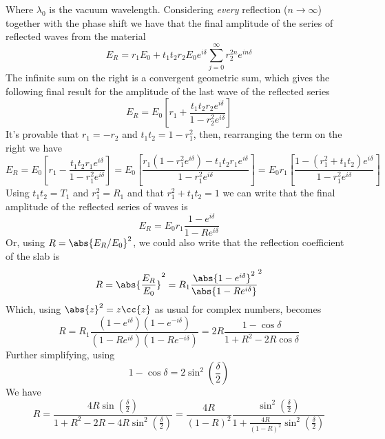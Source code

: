 \documentclass[../electromagnetism.tex]{subfiles}
\begin{document}
Where $\lambda_0$ is the vacuum wavelength. Considering \textit{every} reflection ($n\to\infty$) together with the phase shift we have that the final amplitude of the series of reflected waves from the material
\begin{equation}
	E_R=r_1E_0+t_1t_2r_2E_0e^{i\delta}\sum_{j=0}^{\infty}r^{2n}_2e^{in\delta}
	\label{eq:reflectionseries.mbi}
\end{equation}
The infinite sum on the right is a convergent geometric sum, which gives the following final result for the amplitude of the last wave of the reflected series
\begin{equation*}
	E_R=E_0\left[ r_1+\frac{t_1t_2r_2e^{i\delta}}{1-r_2^2e^{i\delta}} \right]
\end{equation*}
It's provable that $r_1=-r_2$ and $t_1t_2=1-r_1^2$, then, rearranging the term on the right we have
\begin{equation*}
	E_R=E_0\left[ r_1-\frac{t_1t_2r_1e^{i\delta}}{1-r_1^2e^{i\delta}} \right]=E_0\left[ \frac{r_1\left( 1-r_1^2e^{i\delta} \right)-t_1t_2r_1e^{i\delta}}{1-r_1^2e^{i\delta}} \right]=E_0r_1\left[ \frac{1-(r_1^2+t_1t_2)e^{i\delta}}{1-r_1^2e^{i\delta}} \right]
\end{equation*}
Using $t_1t_2=T_1$ and $r_1^2=R_1$ and that $r_1^2+t_1t_2=1$ we can write that the final amplitude of the reflected series of waves is
\begin{equation}
	E_R=E_0r_1\frac{1-e^{i\delta}}{1-Re^{i\delta}}
	\label{eq:refseriesamp.mbi}
\end{equation}
Or, using $R=\abs{E_R/E_0}^2$, we could also write that the reflection coefficient of the slab is
\begin{equation*}
	R=\abs{\frac{E_R}{E_0}}^2=R_1\frac{\abs{1-e^{i\delta}}^2}{\abs{1-Re^{i\delta}}}^2
\end{equation*}
Which, using $\abs{z}^2=z\cc{z}$ as usual for complex numbers, becomes
\begin{equation*}
	R=R_1\frac{(1-e^{i\delta})(1-e^{-i\delta})}{(1-Re^{i\delta})(1-Re^{-i\delta})}=2R\frac{1-\cos\delta}{1+R^2-2R\cos\delta}
\end{equation*}
Further simplifying, using
\begin{equation*}
	1-\cos\delta=2\sin^2\left( \frac{\delta}{2} \right)
\end{equation*}
We have
\begin{equation*}
	R=\frac{4R\sin\left( \frac{\delta}{2} \right)}{1+R^2-2R-4R\sin^2\left( \frac{\delta}{2} \right)}=\frac{4R}{(1-R)^2}\frac{\sin^2\left( \frac{\delta}{2} \right)}{1+\frac{4R}{(1-R)^2}\sin^2\left( \frac{\delta}{2} \right)}
\end{equation*}
\end{document}

